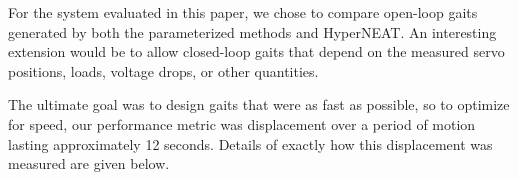 
For the system evaluated in this paper, we chose to compare open-loop gaits generated by both the parameterized methods and
HyperNEAT.  An interesting extension would be to allow closed-loop gaits that depend
on the measured servo positions, loads, voltage drops, or other
quantities.

The ultimate goal was to design gaits that were as fast as possible,
so to optimize for speed, our performance metric was displacement over
a period of motion lasting approximately 12 seconds. Details of
exactly how this displacement was measured are given below.

